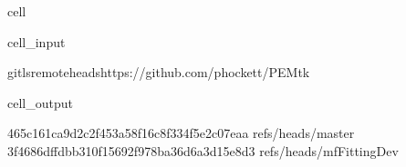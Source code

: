 \documentclass[letterpaper,table,10pt,english]{jupyterBook}
\begin{document}
\begin{sphinxuseclass}{cell}\begin{sphinxVerbatimInput}

\begin{sphinxuseclass}{cell_input}
\begin{sphinxVerbatim}[commandchars=\\\{\}]
gitls\PYGZhy{}remote\PYGZhy{}\PYGZhy{}headshttps://github.com/phockett/PEMtk
\end{sphinxVerbatim}

\end{sphinxuseclass}\end{sphinxVerbatimInput}
\begin{sphinxVerbatimOutput}

\begin{sphinxuseclass}{cell_output}
\begin{sphinxVerbatim}[commandchars=\\\{\}]
465c161ca9d2c2f453a58f16c8f334f5e2c07eaa	refs/heads/master
3f4686dffdbb310f15692f978ba36d6a3d15e8d3	refs/heads/mfFittingDev
\end{sphinxVerbatim}

\end{sphinxuseclass}\end{sphinxVerbatimOutput}

\end{sphinxuseclass}
\end{document}
